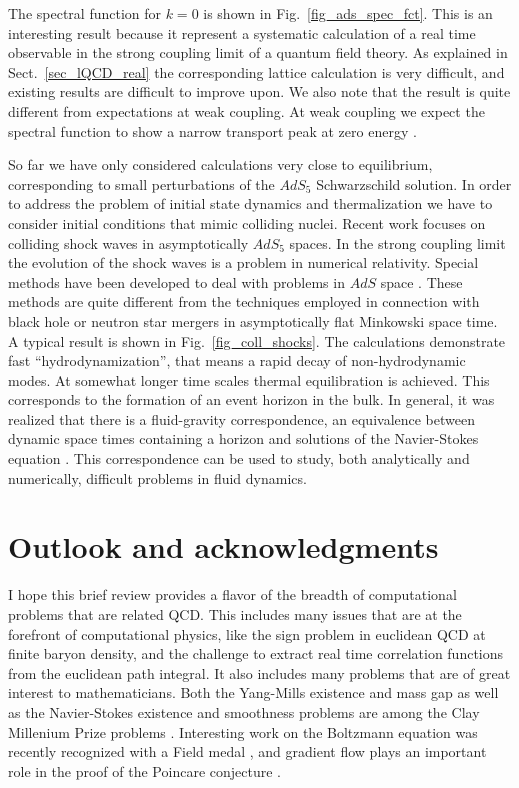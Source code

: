 \vspace*{0.3cm} 
The spectral function for $k=0$ is shown in Fig.~\ref{fig_ads_spec_fct}. This 
is an interesting result because it represent a systematic calculation of a
real time observable in the strong coupling limit of a quantum field theory. 
As explained in Sect.~\ref{sec_lQCD_real} the corresponding lattice 
calculation is very difficult, and existing results are difficult to improve 
upon. We also note that the result is quite different from expectations at 
weak coupling. At weak coupling we expect the spectral function to show a 
narrow transport peak at zero energy \cite{Schaefer:2014awa}.

 So far we have only considered calculations very close to equilibrium, 
corresponding to small perturbations of the $AdS_5$ Schwarzschild solution. 
In order to address the problem of initial state dynamics and thermalization
we have to consider initial conditions that mimic colliding nuclei. Recent
work focuses on colliding shock waves in asymptotically $AdS_5$ spaces. 
In the strong coupling limit the evolution of the shock waves is a problem
in numerical relativity. Special methods have been developed to deal 
with problems in $AdS$ space \cite{Chesler:2013lia}. These methods are 
quite different from the techniques employed in connection with black
hole or neutron star mergers in asymptotically flat Minkowski space time. 
A typical result is shown in Fig.~\ref{fig_coll_shocks}. The calculations
demonstrate fast ``hydrodynamization'', that means a rapid decay of 
non-hydrodynamic modes. At somewhat longer time scales thermal 
equilibration is achieved. This corresponds to the formation of an 
event horizon in the bulk. In general, it was realized that there 
is a fluid-gravity correspondence, an equivalence between dynamic 
space times containing a horizon and solutions of the Navier-Stokes
equation \cite{Rangamani:2009xk}. This correspondence can be used 
to study, both analytically and numerically, difficult problems in 
fluid dynamics.  

\section{Outlook and acknowledgments}
\label{sec_out}

 I hope this brief review provides a flavor of the breadth of computational
problems that are related QCD. This includes many issues that are at the 
forefront of computational physics, like the sign problem in euclidean 
QCD at finite baryon density, and the challenge to extract real time 
correlation functions from the euclidean path integral. It also includes
many problems that are of great interest to mathematicians. Both the 
Yang-Mills existence and mass gap as well as the Navier-Stokes existence 
and smoothness problems are among the Clay Millenium Prize problems
\cite{Clay-YM,Clay-NS}. Interesting work on the Boltzmann equation was 
recently recognized with a Field medal \cite{Villani:2009}, and gradient 
flow plays an important role in the proof of the Poincare conjecture
\cite{Perelman}. 

